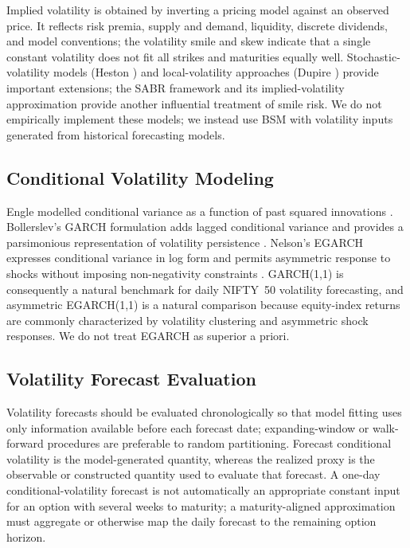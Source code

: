 \documentclass[journal]{IEEEtran}
\begin{document}
Implied volatility is obtained by inverting a pricing model against an observed price. It reflects risk premia, supply and demand, liquidity, discrete dividends, and model conventions; the volatility smile and skew indicate that a single constant volatility does not fit all strikes and maturities equally well. Stochastic-volatility models (Heston \cite{heston1993}) and local-volatility approaches (Dupire \cite{dupire1994}) provide important extensions; the SABR framework and its implied-volatility approximation \cite{sabr2002} provide another influential treatment of smile risk. We do not empirically implement these models; we instead use BSM with volatility inputs generated from historical forecasting models.

\subsection{Conditional Volatility Modeling}

Engle modelled conditional variance as a function of past squared innovations \cite{engle1982}. Bollerslev's GARCH formulation adds lagged conditional variance and provides a parsimonious representation of volatility persistence \cite{bollerslev1986}. Nelson's EGARCH expresses conditional variance in log form and permits asymmetric response to shocks without imposing non-negativity constraints \cite{nelson1991}. GARCH(1,1) is consequently a natural benchmark for daily NIFTY~50 volatility forecasting, and asymmetric EGARCH(1,1) is a natural comparison because equity-index returns are commonly characterized by volatility clustering and asymmetric shock responses. We do not treat EGARCH as superior a priori.

\subsection{Volatility Forecast Evaluation}

Volatility forecasts should be evaluated chronologically so that model fitting uses only information available before each forecast date; expanding-window or walk-forward procedures are preferable to random partitioning. Forecast conditional volatility is the model-generated quantity, whereas the realized proxy is the observable or constructed quantity used to evaluate that forecast. A one-day conditional-volatility forecast is not automatically an appropriate constant input for an option with several weeks to maturity; a maturity-aligned approximation must aggregate or otherwise map the daily forecast to the remaining option horizon.
\end{document}
